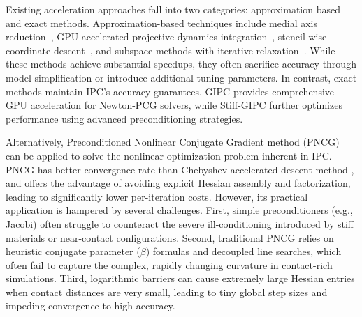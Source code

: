 \documentclass[acmtog,anonymous,review,screen,nonacm]{acmart}
\begin{document}
Existing acceleration approaches fall into two categories: approximation based and exact methods. Approximation-based techniques include medial axis reduction~\cite{lan2021medial}, GPU-accelerated projective dynamics integration~\cite{lan2022penetration}, stencil-wise coordinate descent~\cite{lan2023second}, and subspace methods with iterative relaxation~\cite{li2023subspace}. While these methods achieve substantial speedups, they often sacrifice accuracy through model simplification or introduce additional tuning parameters. In contrast, exact methods maintain IPC's accuracy guarantees. GIPC \cite{huang2024gipc} provides comprehensive GPU acceleration for Newton-PCG solvers, while Stiff-GIPC \cite{huang2025stiffgipc} further optimizes performance using advanced preconditioning strategies. 

Alternatively, Preconditioned Nonlinear Conjugate Gradient method (PNCG)~\cite{shen2024preconditioned} can be applied to solve the nonlinear optimization problem inherent in IPC. PNCG has better convergence rate than Chebyshev accelerated descent method \cite{wang2016descent}, and offers the advantage of avoiding explicit Hessian assembly and factorization, leading to significantly lower per-iteration costs. However, its practical application is hampered by several challenges. First, simple preconditioners (e.g., Jacobi) often struggle to counteract the severe ill-conditioning introduced by stiff materials or near-contact configurations. Second, traditional PNCG relies on heuristic conjugate parameter ($\beta$) formulas and decoupled line searches, which often fail to capture the complex, rapidly changing curvature in contact-rich simulations. Third, logarithmic barriers can cause extremely large Hessian entries when contact distances are very small, leading to tiny global step sizes and impeding convergence to high accuracy.
\end{document}
